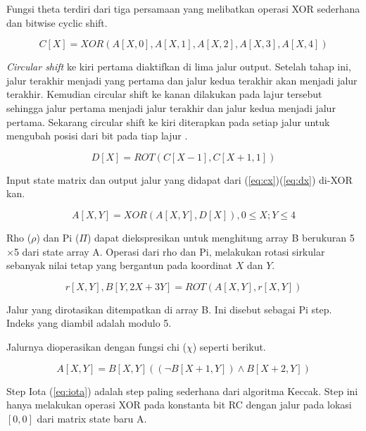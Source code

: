 Fungsi theta terdiri dari tiga persamaan yang melibatkan operasi XOR sederhana dan bitwise cyclic shift.

\begin{equation}
  \label{eq:cx}
  C[X] = XOR(A[X,0], A[X,1], A[X,2], A[X,3], A[X,4])
\end{equation}

\emph{Circular shift} ke kiri pertama diaktifkan di lima jalur output. Setelah tahap ini, jalur terakhir menjadi yang pertama dan jalur kedua terakhir akan menjadi jalur terakhir. Kemudian circular shift ke kanan dilakukan pada lajur tersebut sehingga jalur pertama menjadi jalur terakhir dan jalur kedua menjadi jalur pertama. Sekarang circular shift ke kiri diterapkan pada setiap jalur untuk mengubah posisi dari bit pada tiap lajur \citep{arshad2014,chandran2016}.

\begin{equation}
  \label{eq:dx}
  D[X] = ROT(C[X - 1], C[X + 1, 1])
\end{equation}

Input state matrix dan output jalur yang didapat dari (\ref{eq:cx})(\ref{eq:dx}) di-XOR kan.

\begin{equation}
  \label{eq:axy}
  A[X,Y] = XOR(A[X,Y], D[X]), 0\leq X;Y\leq 4
\end{equation}

Rho (\(\rho\)) dan Pi (\(\Pi\)) dapat diekspresikan untuk menghitung array B berukuran 5\(\times\)5 dari state array A. Operasi dari rho dan Pi, melakukan rotasi sirkular sebanyak nilai tetap yang bergantun pada koordinat \(X\) dan \(Y\).

\begin{equation}
  \label{eq:rxy}
  r[X,Y], B[Y,2X+3Y] = ROT(A[X,Y], r[X,Y])
\end{equation}

Jalur yang dirotasikan ditempatkan di array B. Ini disebut sebagai Pi step. Indeks yang diambil adalah modulo 5.

Jalurnya dioperasikan dengan fungsi chi (\(\chi\)) seperti berikut.

\begin{equation}
  \label{eq:chi}
  A[X,Y]=B[X,Y]((\neg B[X+1,Y]) \land B[X+2,Y])
\end{equation}

Step Iota (\ref{eq:iota}) adalah step paling sederhana dari algoritma Keccak. Step ini hanya melakukan operasi XOR pada konstanta bit RC dengan jalur pada lokasi \([0, 0]\) dari matrix state baru A.

